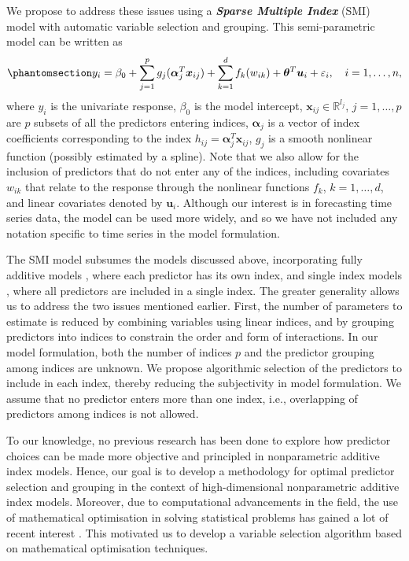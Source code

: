 \documentclass[
  11pt,
  a4paper,
]{article}
\begin{document}
We propose to address these issues using a \textbf{\emph{Sparse Multiple
Index}} (SMI) model with automatic variable selection and grouping. This
semi-parametric model can be written as
\begin{equation}\phantomsection\label{eq-semipara}{
  y_{i} = \beta_{0} + \sum_{j = 1}^{p}g_{j}(\bm{\alpha}_{j}^{T}\bm{x}_{ij}) + \sum_{k = 1}^{d}f_{k}(w_{ik}) + \bm{\theta}^{T}\bm{u}_{i} + \varepsilon_{i}, \quad i = 1, \dots, n,
}\end{equation} where \(y_{i}\) is the univariate response,
\(\beta_{0}\) is the model intercept,
\(\bm{x}_{ij} \in \mathbb{R}^{l_{j}}\), \(j = 1, \dots, p\) are \(p\)
subsets of all the predictors entering indices, \(\bm{\alpha}_{j}\) is a
vector of index coefficients corresponding to the index
\(h_{ij} = \bm{\alpha}_{j}^{T}\bm{x}_{ij}\), \(g_{j}\) is a smooth
nonlinear function (possibly estimated by a spline). Note that we also
allow for the inclusion of predictors that do not enter any of the
indices, including covariates \(w_{ik}\) that relate to the response
through the nonlinear functions \(f_{k}\), \(k = 1, \dots, d\), and
linear covariates denoted by \(\bm{u}_{i}\). Although our interest is in
forecasting time series data, the model can be used more widely, and so
we have not included any notation specific to time series in the model
formulation.

The SMI model subsumes the models discussed above, incorporating fully
additive models \autocite{Wood2011,Wood2017}, where each predictor has
its own index, and single index models
\autocite{Stoker1986,Hardle1993,Radchenko2015}, where all predictors are
included in a single index. The greater generality allows us to address
the two issues mentioned earlier. First, the number of parameters to
estimate is reduced by combining variables using linear indices, and by
grouping predictors into indices to constrain the order and form of
interactions. In our model formulation, both the number of indices \(p\)
and the predictor grouping among indices are unknown. We propose
algorithmic selection of the predictors to include in each index,
thereby reducing the subjectivity in model formulation. We assume that
no predictor enters more than one index, i.e., overlapping of predictors
among indices is not allowed.

To our knowledge, no previous research has been done to explore how
predictor choices can be made more objective and principled in
nonparametric additive index models. Hence, our goal is to develop a
methodology for optimal predictor selection and grouping in the context
of high-dimensional nonparametric additive index models. Moreover, due
to computational advancements in the field, the use of mathematical
optimisation in solving statistical problems has gained a lot of recent
interest \autocite{Theusl2020}. This motivated us to develop a variable
selection algorithm based on mathematical optimisation techniques.
\end{document}
